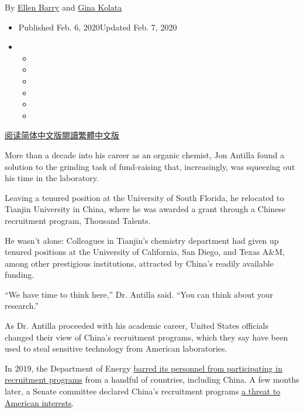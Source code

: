By \href{https://www.nytimes3xbfgragh.onion/by/ellen-barry}{Ellen Barry}
and \href{https://www.nytimes3xbfgragh.onion/by/gina-kolata}{Gina
Kolata}

\begin{itemize}
\item
  Published Feb. 6, 2020Updated Feb. 7, 2020
\item
  \begin{itemize}
  \item
  \item
  \item
  \item
  \item
  \item
  \end{itemize}
\end{itemize}

\href{https://cn.nytimes3xbfgragh.onion/usa/20200207/chinas-lavish-scientific-funds-fall-into-prosecutors-spotlight/}{阅读简体中文版}\href{https://cn.nytimes3xbfgragh.onion/usa/20200207/chinas-lavish-scientific-funds-fall-into-prosecutors-spotlight/zh-hant/}{閱讀繁體中文版}

More than a decade into his career as an organic chemist, Jon Antilla
found a solution to the grinding task of fund-raising that,
increasingly, was squeezing out his time in the laboratory.

Leaving a tenured position at the University of South Florida, he
relocated to Tianjin University in China, where he was awarded a grant
through a Chinese recruitment program, Thousand Talents.

He wasn't alone: Colleagues in Tianjin's chemistry department had given
up tenured positions at the University of California, San Diego, and
Texas A\&M, among other prestigious institutions, attracted by China's
readily available funding.

``We have time to think here,'' Dr. Antilla said. ``You can think about
your research.''

As Dr. Antilla proceeded with his academic career, United States
officials changed their view of China's recruitment programs, which they
say have been used to steal sensitive technology from American
laboratories.

In 2019, the Department of Energy
\href{https://physicstoday.scitation.org/do/10.1063/PT.6.2.20190620a/full/}{barred
its personnel from participating in recruitment programs} from a handful
of countries, including China. A few months later, a Senate committee
declared China's recruitment programs
\href{https://www.hsgac.senate.gov/imo/media/doc/2019-11-18\%20PSI\%20Staff\%20Report\%20-\%20China's\%20Talent\%20Recruitment\%20Plans.pdf}{a
threat to American interests}.

